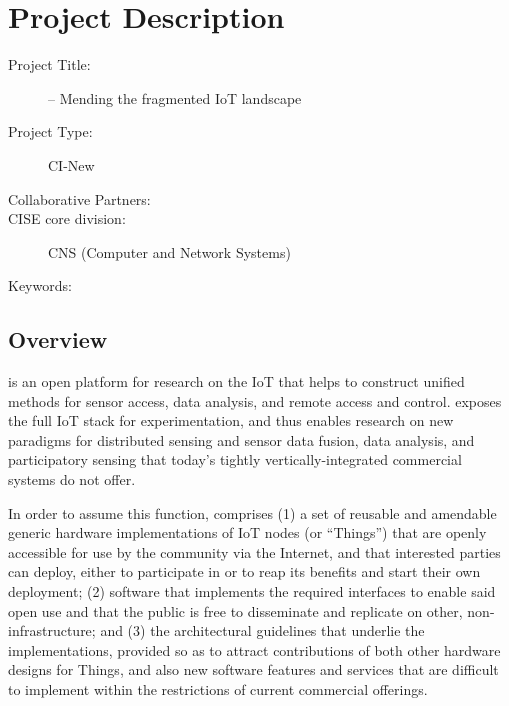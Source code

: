 
\section{Project Description}


\begin{description}
  \item[Project Title:] \sysname -- Mending the fragmented \acrshort{IoT} landscape
  \item[Project Type:] CI-New 
  \item[Collaborative Partners:] 
  \item[CISE core division:] CNS (Computer and Network Systems)
  \item[Keywords:] 
\end{description}


\subsection{Overview}

\sysname is an open platform for research on the \acrfull{IoT}
that helps to construct unified methods for sensor access, data analysis,
and remote access and control. \sysname exposes the full \gls{IoT}
stack for experimentation, and thus enables research on new paradigms
for distributed sensing and sensor data fusion, data analysis, and
participatory sensing that today's tightly vertically-integrated
commercial systems do not offer.

In order to assume this function, \sysname comprises
(1) a set of reusable and amendable generic hardware implementations of
\gls{IoT} nodes (or ``Things'') that are openly accessible for
use by the community via the Internet, and that interested parties
can deploy, either to participate in \sysname or to reap its benefits
and start their own deployment;
(2) software that implements the required interfaces to
enable said open use and that the public is free to disseminate
and replicate on other, non-\sysname infrastructure; and
(3) the architectural guidelines that underlie the implementations,
provided so as to attract contributions of both other hardware
designs for Things, and also new software features and services
that are difficult to implement within the restrictions of current
commercial offerings.\\

